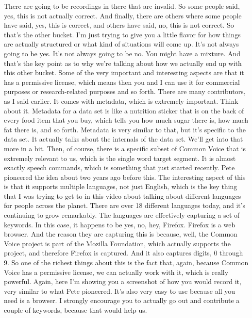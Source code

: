 There are going to be recordings in there that are invalid.
So some people said, yes, this is not actually correct.
And finally, there are others where some people have said, yes, this is correct,
and others have said, no, this is not correct.
So that's the other bucket.
I'm just trying to give you a little flavor
for how things are actually structured or what kind of situations
will come up.
It's not always going to be yes.
It's not always going to be no.
You might have a mixture.
And that's the key point as to why we're talking about how we actually
end up with this other bucket.
Some of the very important and interesting aspects
are that it has a permissive license, which means then you
and I can use it for commercial purposes or research-related purposes
and so forth.
There are many contributors, as I said earlier.
It comes with metadata, which is extremely important.
Think about it.
Metadata for a data set is like a nutrition sticker
that is on the back of every food item that you
buy, which tells you how much sugar there is,
how much fat there is, and so forth.
Metadata is very similar to that, but it's specific to the data set.
It actually talks about the internals of the data set.
We'll get into that more in a bit.
Then, of course, there is a specific subset
of Common Voice that is extremely relevant to us, which
is the single word target segment.
It is almost exactly speech commands, which is
something that just started recently.
Pete pioneered the idea about two years ago before this.
The interesting aspect of this is that it supports multiple languages, not
just English, which is the key thing that I
was trying to get to in this video about talking
about different languages for people across the planet.
There are over 18 different languages today,
and it's continuing to grow remarkably.
The languages are effectively capturing a set of keywords.
In this case, it happens to be yes, no, hey, Firefox.
Firefox is a web browser.
And the reason they are capturing this is because, well, the Common Voice
project is part of the Mozilla Foundation, which
actually supports the project, and therefore Firefox is captured.
And it also captures digits, 0 through 9.
So one of the richest things about this is the fact
that, again, because Common Voice has a permissive license,
we can actually work with it, which is really powerful.
Again, here I'm showing you a screenshot of how you would record it, very
similar to what Pete pioneered.
It's also very easy to use because all you need is a browser.
I strongly encourage you to actually go out and contribute
a couple of keywords, because that would help us.
